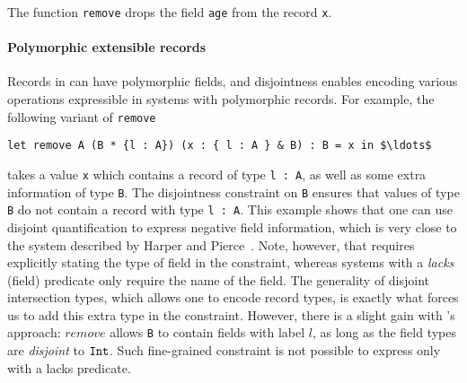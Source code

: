 \noindent The function \lstinline{remove} drops the field
\lstinline{age} from the record \lstinline{x}. 

\paragraph{Polymorphic extensible records} Records in \name can have
polymorphic fields, and disjointness enables encoding various
operations expressible in systems with polymorphic records. For example, 
the following variant of \lstinline{remove}

\begin{lstlisting}[mathescape=true]
let remove A (B * {l : A}) (x : { l : A } & B) : B = x in $\ldots$ 
\end{lstlisting}

\noindent takes a value \lstinline{x} which contains a record of type
\lstinline{l : A}, as well as some extra information of type
\lstinline{B}. The disjointness constraint on \lstinline{B} ensures
that values of type \lstinline{B} do not contain a record with type
\lstinline{l : A}.  This example shows that one
can use disjoint quantification to express negative field information,
which is very close to the system described by Harper and
Pierce~\cite{harper1991record}.  Note, however, that \name requires
explicitly stating the type of field in the constraint, whereas
systems with a \emph{lacks} (field) predicate only require the name of the field.
The generality of disjoint intersection types, which allows one to
encode record types, is exactly what forces us to add this extra type
in the constraint.  However, there is a slight gain with \name's
approach: $remove$ allows \lstinline{B} to contain fields with label $l$, as long as
the field types are \emph{disjoint} to $\texttt{Int}$. Such fine-grained
constraint is not possible to express only with a lacks predicate.

